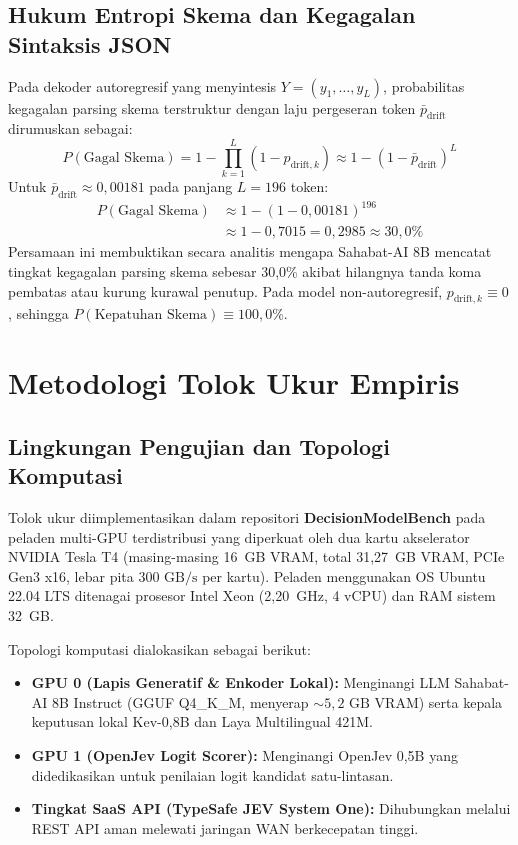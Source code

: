 \documentclass[journal,compsoc]{IEEEtran}
\begin{document}
\subsection{Hukum Entropi Skema dan Kegagalan Sintaksis JSON}
Pada dekoder autoregresif yang menyintesis $Y = (y_1, \dots, y_L)$, probabilitas kegagalan parsing skema terstruktur dengan laju pergeseran token $\bar{p}_{\text{drift}}$ dirumuskan sebagai:
\begin{equation}
P(\text{Gagal Skema}) = 1 - \prod_{k=1}^{L} (1 - p_{\text{drift}, k}) \approx 1 - (1 - \bar{p}_{\text{drift}})^L
\end{equation}
Untuk $\bar{p}_{\text{drift}} \approx 0{,}00181$ pada panjang $L = 196$ token:
\begin{equation}
\begin{aligned}
P(\text{Gagal Skema}) &\approx 1 - (1 - 0{,}00181)^{196} \\
&\approx 1 - 0{,}7015 = 0{,}2985 \approx 30{,}0\%
\end{aligned}
\end{equation}
Persamaan ini membuktikan secara analitis mengapa Sahabat-AI 8B mencatat tingkat kegagalan parsing skema sebesar 30,0\% akibat hilangnya tanda koma pembatas atau kurung kurawal penutup. Pada model non-autoregresif, $p_{\text{drift}, k} \equiv 0$, sehingga $P(\text{Kepatuhan Skema}) \equiv 100{,}0\%$.

\section{Metodologi Tolok Ukur Empiris}

\subsection{Lingkungan Pengujian dan Topologi Komputasi}
Tolok ukur diimplementasikan dalam repositori \textbf{DecisionModelBench} pada peladen multi-GPU terdistribusi yang diperkuat oleh dua kartu akselerator NVIDIA Tesla T4 (masing-masing 16~GB VRAM, total 31,27~GB VRAM, PCIe Gen3 x16, lebar pita $300 \text{ GB/s}$ per kartu). Peladen menggunakan OS Ubuntu 22.04 LTS ditenagai prosesor Intel Xeon (2,20~GHz, 4 vCPU) dan RAM sistem 32~GB.

Topologi komputasi dialokasikan sebagai berikut:
\begin{itemize}
    \item \textbf{GPU 0 (Lapis Generatif \& Enkoder Lokal):} Menginangi LLM Sahabat-AI 8B Instruct (GGUF Q4\_K\_M, menyerap $\sim 5{,}2 \text{ GB}$ VRAM) serta kepala keputusan lokal Kev-0,8B dan Laya Multilingual 421M.
    \item \textbf{GPU 1 (OpenJev Logit Scorer):} Menginangi OpenJev 0,5B yang didedikasikan untuk penilaian logit kandidat satu-lintasan.
    \item \textbf{Tingkat SaaS API (TypeSafe JEV System One):} Dihubungkan melalui REST API aman melewati jaringan WAN berkecepatan tinggi.
\end{itemize}
\end{document}
